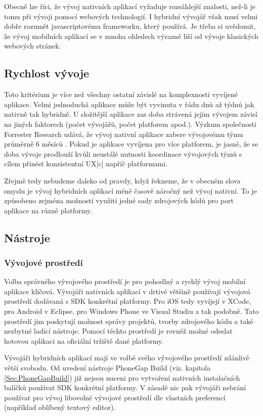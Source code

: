 Obecně lze říci, že vývoj nativních aplikací vyžaduje rozsáhlejší znalosti, než-li je tomu při vývoji pomocí webových technologií. I hybridní vývojář však musí velmi dobře rozumět javascriptovému frameworku, který používá. Je třeba si uvědomit, že vývoj mobilních aplikací se v mnoha ohledech výrazně liší od vývoje klasických webových stránek.

\subsection{Rychlost vývoje}
Toto kritérium je více než všechny ostatní závislé na komplexnosti vyvíjené aplikace. Velmi jednoduchá aplikace může být vyvinuta v řádu dnů až týdnů jak nativně tak hybridně. U složitější aplikace zas doba strávená jejím vývojem závisí na jiných faktorech (počet vývojářů, počet platforem apod.). Výzkum společnosti Forrester Research udává, že vývoj nativní aplikace zabere vývojovému týmu průměrně 6 měsíců \cite{mrc_native_wrong_choice}. Pokud je aplikace vyvíjena pro více platforem, je jasné, že se doba vývoje prodlouží kvůli neustálé nutnosti koordinace vývojových týmů s cílem přinést konzistentní UX[c] napříč platformami.

Zřejmě tedy nebudeme daleko od pravdy, když řekneme, že v obecném slova smyslu je vývoj hybridních aplikací méně časově náročný než vývoj nativní. To je způsobeno zejména možností využití jedné sady zdrojových kódů pro port aplikace na různé platformy.

\subsection{Nástroje}
\subsubsection{Vývojové prostředí}
Volba správného vývojového prostředí je pro pohodlný a rychlý vývoj mobilní aplikace klíčová. Vývojáři nativních aplikací v drtivé většině používají vývojová prostředí dodávaná s SDK konkrétní platformy. Pro iOS tedy vyvíjejí v XCode, pro Android v Eclipse, pro Windows Phone ve Visual Studiu a tak podobně. Tato prostředí jim poskytují možnost správy projektů, tvorby zdrojového kódu a také nezbytné ladící nástroje. Pomocí těchto prostředí je rovněž možné odeslat hotovou aplikaci na oficiální tržiště dané platformy.

Vývojáři hybridních aplikací mají ve volbě svého vývojového prostředí zdánlivě větší svobodu. Od uvedení nástroje PhoneGap Build (viz. kapitola \ref{Sec:PhoneGapBuild}) již nejsou nuceni pro vytvoření nativních instalačních balíčků používat SDK konkrétní platformy. V zásadě nic pak vývojáři nebrání používat pro vývoj libovolné vývojové prostředí dle vlastních preferencí (například oblíbený textový editor).


